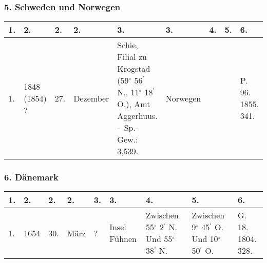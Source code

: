\documentclass[a4paper, 8pt, oneside, polutonikogreek, german]{article}
\begin{document}
\clearpage
\begin{landscape}
\subsubsection{5. Schweden und Norwegen}
\begin{table}[!ht]
    \centering
    \begin{tabular}{|l|p{17mm}|l|l|p{48mm}|l|l|l|p{13mm}|}
    \hline
        1. & 2. & 2. & 2. & 3. & 3. & 4. & 5. & 6. \\ \hline
        1. & 1848 (1854) ? & 27. & Dezember & Schie, Filial zu Krogstad (59$^\circ$ 56$^\prime$ N., 11$^\circ$ 18$^\prime$ O.), Amt Aggerhuus. - Sp.-Gew.: 3,539. & Norwegen & ~ & ~ & P. 96. 1855. 341. \\ \hline
    \end{tabular}
\end{table}
\end{landscape}
\clearpage
\begin{landscape}
\subsubsection{6. Dänemark}
\begin{table}[!ht]
    \centering
    \begin{tabular}{|l|l|l|l|l|l|l|l|p{13mm}|}
    \hline
        1. & 2. & 2. & 2. & 3. & 3. & 4. & 5. & 6. \\ \hline
        1. & 1654 & 30. & März & ? & Insel Fühnen & Zwischen 55$^\circ$ 2$^\prime$ N. Und 55$^\circ$ 38$^\prime$ N. & Zwischen 9$^\circ$ 45$^\prime$ O. Und 10$^\circ$ 50$^\prime$ O. & G. 18. 1804. 328. \\ \hline
    \end{tabular}
\end{table}
\end{landscape}
\clearpage
\end{document}
